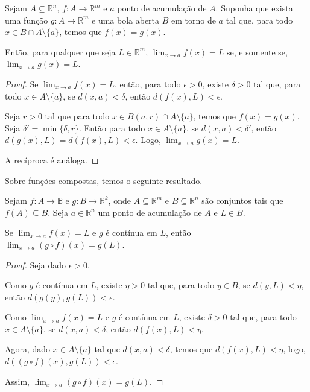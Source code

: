 \begin{proposition}
    Sejam $A\subseteq \mathbb R^n$, $f: A \to \mathbb R^m$ e $a$ ponto de acumulação de $A$.
    Suponha que exista uma função $g: A \to \mathbb R^m$ e uma bola aberta $B$ em torno de $a$ tal que, para todo $x \in B\cap A\setminus\{a\}$, temos que $f(x) = g(x)$.

    Então, para qualquer que seja $L \in \mathbb R^m$, $\lim_{x\to a} f(x) = L$ se, e somente se, $\lim_{x\to a} g(x) = L$.
\end{proposition}
\begin{proof}
    Se $\lim_{x\to a} f(x) = L$, então, para todo $\epsilon>0$, existe $\delta>0$ tal que, para todo $x \in A\setminus\{a\}$, se $d(x, a) < \delta$, então $d(f(x), L) < \epsilon$.

    Seja $r>0$ tal que para todo $x \in B(a, r)\cap A\setminus\{a\}$, temos que $f(x) = g(x)$.
    Seja $\delta' = \min\{\delta, r\}$.
    Então para todo $x \in A\setminus\{a\}$, se $d(x, a) < \delta'$, então $d(g(x), L) = d(f(x), L) < \epsilon$.
    Logo, $\lim_{x\to a} g(x) = L$.

    A recíproca é análoga.
\end{proof}

Sobre funções compostas, temos o seguinte resultado.
\begin{proposition}
    Sejam $f: A \to \mathbb B$ e $g: B \to \mathbb R^k$, onde $A\subseteq \mathbb R^m$ e $B\subseteq \mathbb R^n$ são conjuntos tais que $f(A)\subseteq B$.
    Seja $a \in \mathbb R^n$ um ponto de acumulação de $A$ e $L \in B$.

    Se $\lim_{x\to a} f(x) = L$ e $g$ é contínua em $L$, então $\lim_{x\to a} (g\circ f)(x) = g(L)$.
\end{proposition}

\begin{proof}
    Seja dado $\epsilon>0$.

    Como $g$ é contínua em $L$, existe $\eta>0$ tal que, para todo $y \in B$, se $d(y, L) < \eta$, então $d(g(y), g(L)) < \epsilon$.

    Como $\lim_{x\to a} f(x) = L$ e $g$ é contínua em $L$, existe $\delta>0$ tal que, para todo $x \in A\setminus\{a\}$, se $d(x, a) < \delta$, então $d(f(x), L) < \eta$.


    Agora, dado $x \in A\setminus\{a\}$ tal que $d(x, a) < \delta$, temos que $d(f(x), L) < \eta$, logo, $d((g\circ f)(x), g(L)) < \epsilon$.

    Assim, $\lim_{x\to a} (g\circ f)(x) = g(L)$.
\end{proof}

